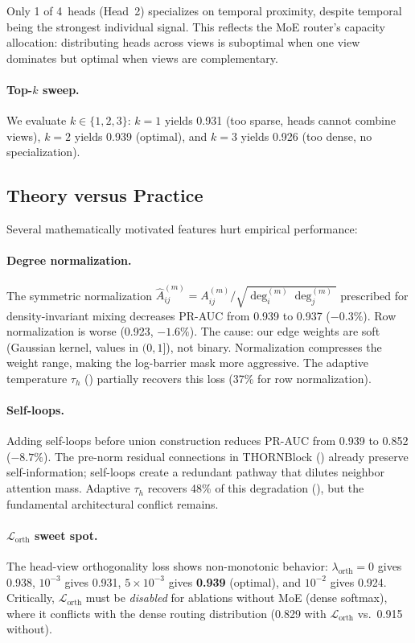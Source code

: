 \documentclass[11pt,a4paper]{article}
\newcommand{\calL}{\mathcal{L}}
\begin{document}
Only 1 of 4~heads (Head~2) specializes on temporal proximity, despite
temporal being the strongest individual signal.
This reflects the MoE router's capacity allocation: distributing heads
across views is suboptimal when one view dominates but optimal when views
are complementary.

\paragraph{Top-$k$ sweep.}
We evaluate $k \in \{1, 2, 3\}$: $k=1$ yields 0.931 (too sparse,
heads cannot combine views), $k=2$ yields 0.939 (optimal), and $k=3$
yields 0.926 (too dense, no specialization).

\subsection{Theory versus Practice}
\label{sec:theory_vs_practice}

Several mathematically motivated features hurt empirical performance:

\paragraph{Degree normalization.}
The symmetric normalization
$\hat{A}_{ij}^{(m)} = A_{ij}^{(m)} / \sqrt{\deg_i^{(m)} \deg_j^{(m)}}$
prescribed for density-invariant mixing decreases PR-AUC from 0.939 to
0.937 ($-0.3\%$).
Row normalization is worse (0.923, $-1.6\%$).
The cause: our edge weights are soft (Gaussian kernel, values in
$(0, 1]$), not binary.
Normalization compresses the weight range, making the
log-barrier mask more aggressive.
The adaptive temperature $\tau_h$ () partially
recovers this loss (37\% for row normalization).

\paragraph{Self-loops.}
Adding self-loops before union construction reduces PR-AUC from 0.939 to
0.852 ($-8.7\%$).
The pre-norm residual connections in THORNBlock
() already preserve self-information; self-loops
create a redundant pathway that dilutes neighbor attention mass.
Adaptive $\tau_h$ recovers 48\% of this degradation
(), but the fundamental architectural conflict
remains.

\paragraph{$\calL_{\mathrm{orth}}$ sweet spot.}
The head-view orthogonality loss shows non-monotonic behavior:
$\lambda_{\mathrm{orth}} = 0$ gives 0.938, $10^{-3}$ gives 0.931,
$5 \times 10^{-3}$ gives \textbf{0.939} (optimal), and $10^{-2}$ gives
0.924.
Critically, $\calL_{\mathrm{orth}}$ must be \emph{disabled} for
ablations without MoE (dense softmax), where it conflicts with the dense
routing distribution (0.829 with $\calL_{\mathrm{orth}}$ vs.\ 0.915
without).
\end{document}
